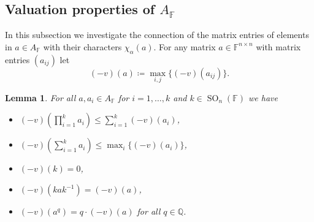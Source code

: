 \documentclass[12pt]{amsart}
\newcommand{\F}{\mathbb{F} }
\newcommand{\Q}{\mathbb{Q} }
\numberwithin{equation}{section}
\newtheorem{lemma}[theorem]{Lemma}
\theoremstyle{remark} %
\begin{document}
\subsection{Valuation properties of \texorpdfstring{$A_\F$}{A(F)}} \label{sec:matrixvaluation}

In this subsection we investigate the connection of the matrix entries of elements in $a \in A_\F$ with their characters $\chi_\alpha(a)$. For any matrix $a \in \F^{n\times n}$ with matrix entries $(a_{ij})$ let
$$
(-v)(a) \coloneqq \max_{i,j} \{ (-v)(a_{ij}) \}.
$$

\begin{lemma}\label{lem:matrixvaluation}
	For all $a, a_i \in A_\F$ for $i= 1, \ldots , k$ and $k\in \operatorname{SO}_n(\F)$ we have
	\begin{itemize}
		\item [(i)] $(-v)\left( \prod_{i=1}^k a_i\right)  \leq \sum_{i=1}^k (-v)(a_i)$,
		\item [(ii)] $(-v)\left(\sum_{i=1}^k a_i\right) \leq \max_i \{ (-v)(a_i) \}$,
		\item [(iii)] $(-v)(k) = 0$,
		\item [(iv)] $(-v)(kak^{-1}) = (-v)(a)$,
		\item [(v)] $(-v)(a^{q}) = q \cdot (-v)(a)$ for all $q\in \Q$. 
	\end{itemize}
\end{lemma}
\end{document}
